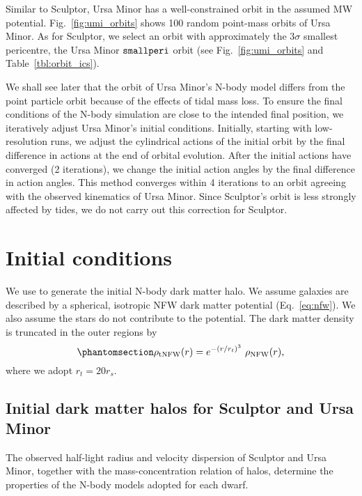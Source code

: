 Similar to Sculptor, Ursa Minor has a well-constrained orbit in the
assumed MW potential. Fig.~\ref{fig:umi_orbits} shows 100 random
point-mass orbits of Ursa Minor. As for Sculptor, we select an orbit
with approximately the \(3\sigma\) smallest pericentre, the Ursa Minor
\({\tt smallperi}{}\) orbit (see Fig.~\ref{fig:umi_orbits} and
Table~\ref{tbl:orbit_ics}).

We shall see later that the orbit of Ursa Minor's N-body model differs
from the point particle orbit because of the effects of tidal mass loss.
To ensure the final conditions of the N-body simulation are close to the
intended final position, we iteratively adjust Ursa Minor's initial
conditions. Initially, starting with low-resolution runs, we adjust the
cylindrical actions of the initial orbit by the final difference in
actions at the end of orbital evolution. After the initial actions have
converged (2 iterations), we change the initial action angles by the
final difference in action angles. This method converges within 4
iterations to an orbit agreeing with the observed kinematics of Ursa
Minor. Since Sculptor's orbit is less strongly affected by tides, we do
not carry out this correction for Sculptor.

\section{Initial conditions}\label{initial-conditions}

We use \agama{} \citep{agama} to generate the initial N-body dark matter
halo. We assume galaxies are described by a spherical, isotropic NFW
dark matter potential (Eq.~\ref{eq:nfw}). We also assume the stars do
not contribute to the potential. The dark matter density is truncated in
the outer regions by
\begin{equation}\protect\phantomsection\label{eq:trunc_nfw}{
\rho_{\rm tNFW}(r) = e^{-(r/r_t)^3}\ \rho_{\rm NFW}(r),
}\end{equation} where we adopt \(r_t = 20 r_s\).

\subsection{Initial dark matter halos for Sculptor and Ursa
Minor}\label{initial-dark-matter-halos-for-sculptor-and-ursa-minor}

The observed half-light radius and velocity dispersion of Sculptor and
Ursa Minor, together with the mass-concentration relation of \LCDM{}
halos, determine the properties of the N-body models adopted for each
dwarf.

